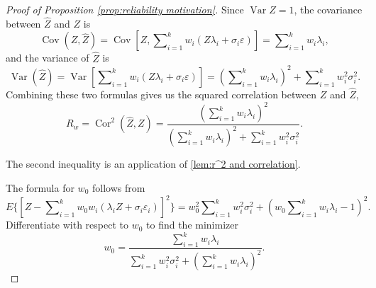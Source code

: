 \documentclass[twoside]{article}
\DeclareMathOperator{\Var}{Var}
\DeclareMathOperator{\Cor}{Cor}
\DeclareMathOperator{\Cov}{Cov}
\DeclareMathOperator{\tsum}{\textstyle \sum}
\begin{document}
\begin{proof}[Proof of Proposition \ref{prop:reliability motivation}]\label{proof:reliability motivation}
Since $\Var Z=1$, the covariance between $\hat{Z}$ and $Z$
is
\begin{equation}
\Cov(Z,\hat{Z})=\Cov[Z,{\textstyle\tsum_{i=1}^{k}w_{i}}(Z\lambda_{i}+\sigma_{i}\varepsilon)]  =  {\textstyle\tsum_{i=1}^{k}w_{i}}\lambda_{i},
\end{equation}
and the variance of $\hat{Z}$ is
\[
\Var(\hat{Z})=\Var[{\textstyle\tsum_{i=1}^{k}}w_{i}(Z\lambda_{i}+\sigma_{i}\varepsilon)]
=({\textstyle\tsum_{i=1}^{k}}w_{i}\lambda_{i})^{2}+\tsum_{i=1}^{k}w_{i}^{2}\sigma_{i}^{2}.
\]
Combining these two formulas gives us the squared correlation between
$Z$ and $\hat{Z}$,
\begin{equation}
 R_w=\Cor^{2}(\hat{Z},Z) = \frac{(\tsum_{i=1}^{k}w_{i}\lambda_{i})^{2}}{(\tsum_{i=1}^{k}w_{i}\lambda_{i})^{2}+\tsum_{i=1}^{k}w_{i}^{2}\sigma_{i}^{2}}.
\end{equation}

The second inequality is an application of \cref{lem:r^2 and correlation}.

The formula for $w_0$ follows from
\begin{equation*}
E\{[Z-\tsum_{i=1}^{k}w_{0}w_{i}(\lambda_{i}Z+\sigma_{i}\varepsilon_{i})]^{2}\} = w_{0}^{2}\tsum_{i=1}^{k}w_{i}^{2}\sigma_{i}^{2}+(w_{0}\tsum_{i=1}^{k}w_{i}\lambda_{i}-1)^{2}.
\end{equation*}
Differentiate with respect to $w_{0}$ to find the minimizer
\[
w_{0}=\frac{\tsum_{i=1}^{k}w_{i}\lambda_{i}}{\tsum_{i=1}^{k}w_{i}^{2}\sigma_{i}^{2}+(\tsum_{i=1}^{k}w_{i}\lambda_{i})^{2}}.
\]
\end{proof}
\end{document}
